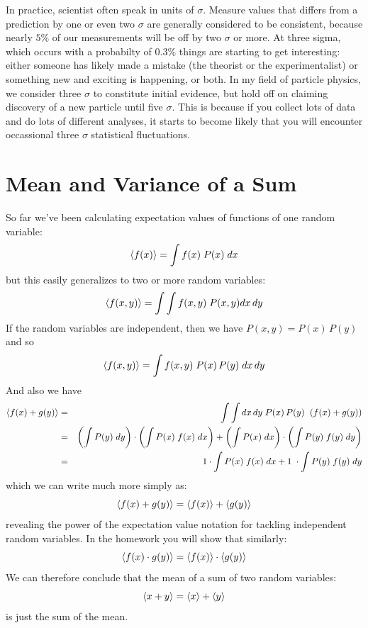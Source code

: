 \documentclass[12pt,oneside]{book}
\begin{document}
In practice, scientist often speak in units of $\sigma$.  Measure
values that differs from a prediction by one or even two $\sigma$ are
generally considered to be consistent, because nearly $5\%$ of our
measurements will be off by two $\sigma$ or more.  At three sigma,
which occurs with a probabilty of $0.3\%$ things are starting to get
interesting: either someone has likely made a mistake (the theorist or
the experimentalist) or something new and exciting is happening, or
both.  In my field of particle physics, we consider three $\sigma$ to
constitute initial evidence, but hold off on claiming discovery of a
new particle until five $\sigma$.  This is because if you collect lots
of data and do lots of different analyses, it starts to become likely that
you will encounter occassional three $\sigma$ statistical fluctuations.

\section{Mean and Variance of a Sum}

So far we've been calculating expectation values of functions of one random variable: 
\begin{displaymath}
\braket{f(x)} = \int f(x) \; P(x) \; dx
\end{displaymath}
but this easily generalizes to two or more random variables:
\begin{displaymath}
\braket{f(x,y)} = \int \int f(x,y) \; P(x,y) dx \, dy 
\end{displaymath}
If the random variables are independent, then we have $P(x,y) = P(x) \, P(y)$ and so
\begin{displaymath}
\braket{f(x,y)} = \int f(x,y) \; P(x) \, P(y) \; dx \, dy
\end{displaymath}
And also we have
\begin{eqnarray*}
\braket{f(x)+g(y)} &=& \int \int dx \, dy \; P(x) \, P(y) \;\; (f(x) + g(y)) \\
&=& \left(\int P(y) \; dy \right) \cdot \left( \int P(x) \; f(x) \; dx  \right) 
+ \left(\int P(x) \; dx \right) \cdot \left( \int P(y) \; f(y) \; dy  \right)\\
&=& 1 \cdot \int P(x) \; f(x) \; dx  + 1 \; \cdot \int P(y) \; f(y) \; dy \\
\end{eqnarray*}
which we can write much more simply as:
\begin{displaymath}
\braket{f(x)+g(y)} = \braket{f(x)}+\braket{g(y)}
\end{displaymath}
revealing the power of the expectation value notation for tackling independent random variables.  In the homework you will show that similarly:
\begin{equation}
\braket{f(x) \cdot g(y)} = \braket{f(x)} \cdot \braket{g(y)} \label{eqn:expprod}
\end{equation}
We can therefore conclude that the mean of a sum of two random variables:
\begin{displaymath}
\braket{x + y} = \braket{x} + \braket{y} 
\end{displaymath}
is just the sum of the mean.  
\end{document}
